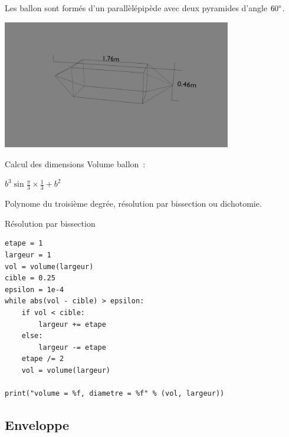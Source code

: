 \documentclass{beamer}
\begin{document}
\begin{frame}
  Les ballon sont formés d'un parallèlépipède avec deux pyramides d'angle $60\degree$. \\
  \begin{center}
    \includegraphics[width=10cm]{../Images/ballon.png}
  \end{center}
\end{frame}

\begin{frame}{Calcul des dimensions}
  Volume ballon~:
  \begin{center}
    \medbreak
    $b^3 \sin \frac{\pi}{3} \times \frac{1}{3} + b^2$
  \end{center}
  Polynome du troisième degrée, résolution par bissection ou dichotomie.
\end{frame}

\begin{frame}[fragile]{Résolution par bissection}
  \begin{lstlisting}[frame=single]
etape = 1
largeur = 1
vol = volume(largeur)
cible = 0.25
epsilon = 1e-4
while abs(vol - cible) > epsilon:
	if vol < cible:
		largeur += etape
	else:
		largeur -= etape
	etape /= 2
	vol = volume(largeur)

print("volume = %f, diametre = %f" % (vol, largeur))
  \end{lstlisting}
\end{frame}

\subsection{Enveloppe}
\end{document}
